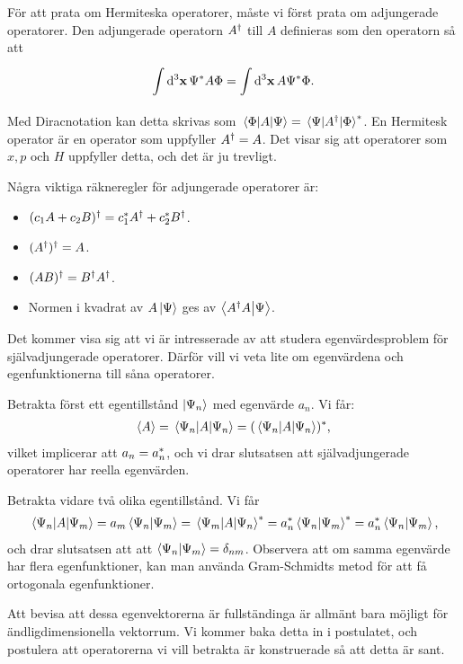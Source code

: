 För att prata om Hermiteska operatorer, måste vi först prata om adjungerade operatorer. Den adjungerade operatorn $A^{\dagger}$ till $A$ definieras som den operatorn så att
\begin{align*}
	\int\limits_{}^{}\dd[3]{\vb{x}}\Psi^{*}A\Phi = \int\limits_{}^{}\dd[3]{\vb{x}}A\Psi^{*}\Phi.
\end{align*}
Med Diracnotation kan detta skrivas som $\mel{\Phi}{A}{\Psi} = \mel{\Psi}{A^{\dagger}}{\Phi}^{*}$. En Hermitesk operator är en operator som uppfyller $A^{\dagger} = A$. Det visar sig att operatorer som $x, p$ och $H$ uppfyller detta, och det är ju trevligt.

Några viktiga räkneregler för adjungerade operatorer är:
\begin{itemize}
	\item $(c_{1}A + c_{2}B)^{\dagger} = c_{1}^{*}A^{\dagger} + c_{2}^{*}B^{\dagger}$.
	\item $(A^{\dagger})^{\dagger} = A$.
	\item $(AB)^{\dagger} = B^{\dagger}A^{\dagger}$.
	\item Normen i kvadrat av $A\ket{\Psi}$ ges av $\braket{A^{\dagger}A}{\Psi}$.
\end{itemize}

Det kommer visa sig att vi är intresserade av att studera egenvärdesproblem för självadjungerade operatorer. Därför vill vi veta lite om egenvärdena och egenfunktionerna till såna operatorer.

Betrakta först ett egentillstånd $\ket{\Psi_{n}}$ med egenvärde $a_{n}$. Vi får:
\begin{align*}
	\expval{A} = \expval{A}{\Psi_{n}} = (\expval{A}{\Psi_{n}})^{*},
\end{align*}
vilket implicerar att $a_{n} = a_{n}^{*}$, och vi drar slutsatsen att självadjungerade operatorer har reella egenvärden.

Betrakta vidare två olika egentillstånd. Vi får
\begin{align*}
	\mel{\Psi_{n}}{A}{\Psi_{m}} = a_{m}\braket{\Psi_{n}}{\Psi_{m}} = \mel{\Psi_{m}}{A}{\Psi_{n}}^{*} = a_{n}^{*}\braket{\Psi_{n}}{\Psi_{m}}^{*} = a_{n}^{*}\braket{\Psi_{n}}{\Psi_{m}},
\end{align*}
och drar slutsatsen att att $\braket{\Psi_{n}}{\Psi_{m}} = \delta_{nm}$. Observera att om samma egenvärde har flera egenfunktioner, kan man använda Gram-Schmidts metod för att få ortogonala egenfunktioner.

Att bevisa att dessa egenvektorerna är fullständinga är allmänt bara möjligt för ändligdimensionella vektorrum. Vi kommer baka detta in i postulatet, och postulera att operatorerna vi vill betrakta är konstruerade så att detta är sant.

